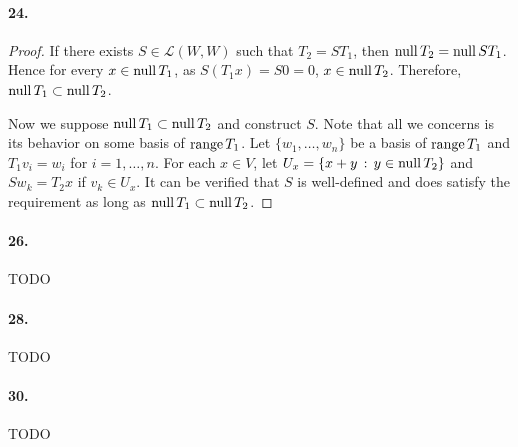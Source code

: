   \paragraph{24.}
  \begin{proof}
    If there exists $S\in\mathcal{L}(W,W)$ such that $T_2=ST_1$, then $\operatorname{null} T_2
    =\operatorname{null} ST_1$. Hence for every $x\in\operatorname{null} T_1$, as $S(T_1x)=S0 = 0$, $x\in\operatorname{null}
    T_2$. Therefore, $\operatorname{null} T_1\subset\operatorname{null} T_2$.\par
    Now we suppose $\operatorname{null} T_1\subset\operatorname{null} T_2$ and construct $S$. Note that all we
    concerns is its behavior on some basis of $\operatorname{range} T_1$. Let $\{w_1, \dots, 
    w_n\}$ be a basis of $\operatorname{range} T_1$ and $T_1v_i = w_i$ for $i=1,\dots,n$. For
    each $x\in V$, let $U_x = \{x+y\,:\,y\in\operatorname{null} T_2\}$ and $Sw_k=T_2x$ if $v_k
    \in U_x$. It can be verified that $S$ is well-defined and does satisfy the
    requirement as long as $\operatorname{null} T_1\subset\operatorname{null} T_2$.
  \end{proof}

  \paragraph{26.} TODO

  \paragraph{28.} TODO

  \paragraph{30.} TODO

